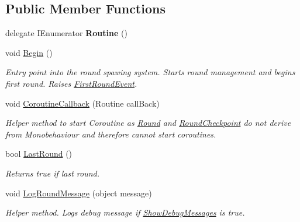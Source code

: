 \subsection*{Public Member Functions}
\begin{DoxyCompactItemize}
\item 
\hypertarget{class_round_manager_1_1_round_manager_a6f1580fda06e9259f21ce893ce8a36c9}{}delegate I\+Enumerator {\bfseries Routine} ()\label{class_round_manager_1_1_round_manager_a6f1580fda06e9259f21ce893ce8a36c9}

\item 
void \hyperlink{class_round_manager_1_1_round_manager_af375ca2448620df4c1fada0281af2621}{Begin} ()
\begin{DoxyCompactList}\small\item\em Entry point into the round spawing system. Starts round management and begins first round. Raises \hyperlink{class_round_manager_1_1_events_1_1_first_round_event}{First\+Round\+Event}. \end{DoxyCompactList}\item 
void \hyperlink{class_round_manager_1_1_round_manager_a945a470717c343cd105865b5bf259535}{Coroutine\+Callback} (Routine call\+Back)
\begin{DoxyCompactList}\small\item\em Helper method to start Coroutine as \hyperlink{class_round_manager_1_1_round}{Round} and \hyperlink{class_round_manager_1_1_round_checkpoint}{Round\+Checkpoint} do not derive from Monobehaviour and therefore cannot start coroutines. \end{DoxyCompactList}\item 
bool \hyperlink{class_round_manager_1_1_round_manager_a1d5785c7724638fd71cb08c68a27a4db}{Last\+Round} ()
\begin{DoxyCompactList}\small\item\em Returns true if last round. \end{DoxyCompactList}\item 
void \hyperlink{class_round_manager_1_1_round_manager_ac7c22eb7e7e06997d133093244767481}{Log\+Round\+Message} (object message)
\begin{DoxyCompactList}\small\item\em Helper method. Logs debug message if \hyperlink{class_round_manager_1_1_round_manager_a3c6edeb40fd89225aad834d63a08f4d3}{Show\+Debug\+Messages} is true. \end{DoxyCompactList}\end{DoxyCompactItemize}
